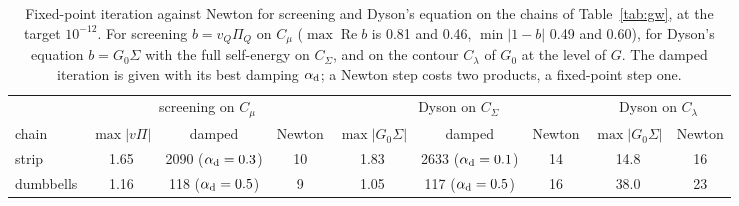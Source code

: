 \documentclass[aps,prb,reprint,a4paper]{revtex4-2}
\DeclareMathOperator{\Real}{Re}
\begin{document}
\begin{table}[t]
\caption{Fixed-point iteration against Newton for screening and Dyson's equation on the chains of Table~\ref{tab:gw}, at the target $10^{-12}$. For screening $b=v_Q\Pi_Q$ on $C_\mu$ ($\max\Real b$ is 0.81 and 0.46, $\min\lvert1-b\rvert$ 0.49 and 0.60), for Dyson's equation $b=G_0\Sigma$ with the full self-energy on $C_\Sigma$, and on the contour $C_\lambda$ of $G_0$ at the level of $G$. The damped iteration is given with its best damping $\alpha_{\rm d}$; a Newton step costs two products, a fixed-point step one.}
\label{tab:iteration}
\centering\small
\setlength{\tabcolsep}{5pt}
\begin{tabular}{@{}lcccccccc@{}}
\toprule
 & \multicolumn{3}{c}{screening on $C_\mu$} & \multicolumn{3}{c}{Dyson on $C_\Sigma$} & \multicolumn{2}{c}{Dyson on $C_\lambda$} \\
chain & $\max\lvert v\Pi\rvert$ & damped & Newton & $\max\lvert G_0\Sigma\rvert$ & damped & Newton & $\max\lvert G_0\Sigma\rvert$ & Newton \\
\midrule
strip & 1.65 & 2090 ($\alpha_{\rm d}=0.3$) & 10 & 1.83 & 2633 ($\alpha_{\rm d}=0.1$) & 14 & 14.8 & 16 \\
dumbbells & 1.16 & 118 ($\alpha_{\rm d}=0.5$) & 9 & 1.05 & 117 ($\alpha_{\rm d}=0.5$) & 16 & 38.0 & 23 \\
\bottomrule
\end{tabular}
\end{table}
\end{document}
